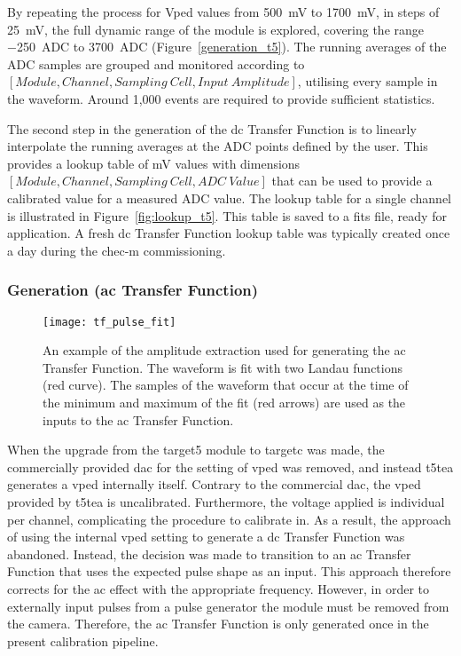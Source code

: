 By repeating the process for Vped values from \SI{500}{mV} to \SI{1700}{mV}, in steps of \SI{25}{mV}, the full dynamic range of the module is explored, covering the range \SI{-250}{ADC} to \SI{3700}{ADC} (Figure~\ref{generation_t5}). The running averages of the ADC samples are grouped and monitored according to $[Module, Channel, Sampling~Cell, Input~Amplitude]$, utilising every sample in the waveform. Around 1,000 events are required to provide sufficient statistics.

The second step in the generation of the \gls{dc} Transfer Function is to linearly interpolate the running averages at the ADC points defined by the user. This provides a lookup table of \si{mV} values with dimensions $[Module, Channel, Sampling~Cell, ADC~Value]$ that can be used to provide a calibrated value for a measured ADC value. The lookup table for a single channel is illustrated in Figure~\ref{fig:lookup_t5}. This table is saved to a \gls{fits} file, ready for application. A fresh \gls{dc} Transfer Function lookup table was typically created once a day during the \gls{chec-m} commissioning.

\subsubsection{Generation (\gls{ac} Transfer Function)}

\begin{figure}
	\centering
    \texttt{[image: tf\_pulse\_fit]} 
	\caption[Fit of the waveform in order to extract samples to generate the \gls{ac} Transfer Function.]{An example of the amplitude extraction used for generating the \gls{ac} Transfer Function. The waveform is fit with two Landau functions (red curve). The samples of the waveform that occur at the time of the minimum and maximum of the fit (red arrows) are used as the inputs to the \gls{ac} Transfer Function.} 
	\label{fig:tf_pulse_fit}
\end{figure}

When the upgrade from the \gls{target5} module to \gls{targetc} was made, the commercially provided \gls{dac} for the setting of \gls{vped} was removed, and instead \gls{t5tea} generates a \gls{vped} internally itself. Contrary to the commercial \gls{dac}, the \gls{vped} provided by \gls{t5tea} is uncalibrated. Furthermore, the voltage applied is individual per channel, complicating the procedure to calibrate in. As a result, the approach of using the internal \gls{vped} setting to generate a \gls{dc} Transfer Function was abandoned. Instead, the decision was made to transition to an \gls{ac} Transfer Function that uses the expected pulse shape as an input. This approach therefore corrects for the \gls{ac} effect with the appropriate frequency. However, in order to externally input pulses from a pulse generator the module must be removed from the camera. Therefore, the \gls{ac} Transfer Function is only generated once in the present calibration pipeline.
	
